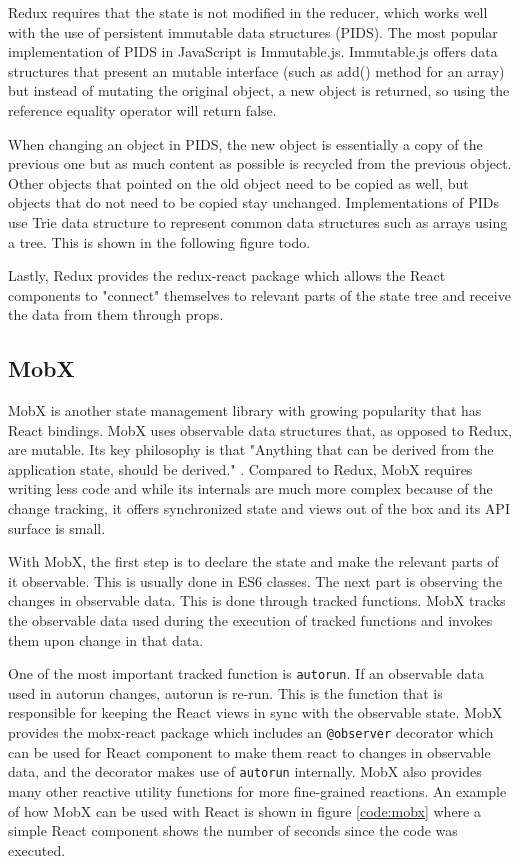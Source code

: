 Redux requires that the state is not modified in the reducer, which works well with the use of persistent immutable data structures \cite{redux:intro} (PIDS). The most popular implementation of PIDS in JavaScript is Immutable.js. Immutable.js offers data structures that present an mutable interface (such as add() method for an array) but instead of mutating the original object, a new object is returned, so using the reference equality operator will return false.

When changing an object in PIDS, the new object is essentially a copy of the previous one but as much content as possible is recycled from the previous object. Other objects that pointed on the old object need to be copied as well, but objects that do not need to be copied stay unchanged. Implementations of PIDs use Trie data structure to represent common data structures such as arrays using a tree. This is shown in the following figure todo. 

Lastly, Redux provides the redux-react package which allows the React components to "connect" themselves to relevant parts of the state tree and receive the data from them through props.


\subsection{MobX}

MobX is another state management library with growing popularity that has React bindings. MobX uses observable data structures that, as opposed to Redux, are mutable. Its key philosophy is that "Anything that can be derived from the application state, should be derived." \cite{mobx:intro}. Compared to Redux, MobX requires writing less code and while its internals are much more complex because of the change tracking, it offers synchronized state and views out of the box and its API surface is small.

With MobX, the first step is to declare the state and make the relevant parts of it observable. This is usually done in ES6 classes.
The next part is observing the changes in observable data. This is done through tracked functions. MobX tracks the observable data used during the execution of tracked functions and invokes them upon change in that data. 

One of the most important tracked function is \texttt{autorun}. If an observable data used in autorun changes, autorun is re-run. This is the function that is responsible for keeping the React views in sync with the observable state. MobX provides the mobx-react package which includes an \texttt{@observer} decorator which can be used for React component to make them react to changes in observable data, and the decorator makes use of \texttt{autorun} internally.
MobX also provides many other reactive utility functions for more fine-grained reactions. An example of how MobX can be used with React is shown in figure \ref{code:mobx} where a simple React component shows the number of seconds since the code was executed.


